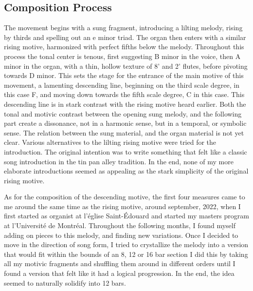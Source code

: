 \documentclass[12pt,twoside,maitrise]{dms_ks}
\theoremstyle{definition}
\begin{document}
\subsection{Composition Process}

The movement begins with a sung fragment, introducing a lilting melody, rising by thirds and spelling out an e minor triad.
The organ then enters with a similar rising motive, harmonized with perfect fifths below the melody.
Throughout this process the tonal center is tenous, first suggesting B minor in the voice, then A minor in the organ, with a thin, hollow texture of 8' and 2' flutes, before pivoting towards D minor.
This sets the stage for the entrance of the main motive of this movement, a lamenting descending line, beginning on the third scale degree, in this case F, and moving down towards the fifth scale degree, C in this case.
This descending line is in stark contrast with the rising motive heard earlier.
Both the tonal and motivic contrast between the opening sung melody, and the following part create a dissonance, not in a harmonic sense, but in a temporal, or symbolic sense.
The relation between the sung material, and the organ material is not yet clear.
Various alternatives to the lilting rising motive were tried for the introduction.
The original intention was to write something that felt like a classic song introduction in the tin pan alley tradition.
In the end, none of my more elaborate introductions seemed as appealing as the stark simplicity of the original rising motive.



As for the composition of the descending motive, the first four measures came to me around the same time as the rising motive, around september, 2022, when I first started as organist at l'église Saint-Édouard and started my masters program at l'Université de Montréal.
Throughout the following months, I found myself adding on pieces to this melody, and finding new variations.
Once I decided to move in the direction of song form, I tried to crystallize the melody into a version that would fit within the bounds of an 8, 12 or 16 bar section I did this by taking all my motivic fragments and shuffling them around in different orders until I found a version that felt like it had a logical progression.
In the end, the idea seemed to naturally solidify into 12 bars.
\end{document}
